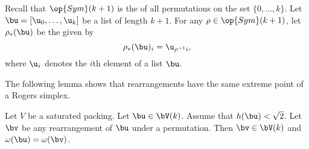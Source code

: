 Recall that $\op{Sym}(k+1)$ is the  of all permutations
on the set $\{0,\ldots,k\}$.  Let $\bu = [\u_0,\ldots, \u_k]$ be a
list of length $k+1$.  For any 
$\rho\in\op{Sym}(k+1)$, let $\rho_*(\bu)$ be the 
given by
\[  
\rho_*(\bu)_i =  \u_{\rho^{-1} i}, %
\]    
where $\u_i$ denotes the $i$th element of a list $\bu$.
%
%
%
%

The following lemma shows that rearrangements have the same extreme
point of a Rogers simplex.

\begin{lemma}
\label{lemma:perm-Vk} 
  Let $V$ be a saturated packing.  Let $\bu\in \bV(k)$.  Assume that
  $h(\bu)<\sqrt2$. Let $\bv$ be any rearrangement of $\bu$ under a
  permutation.  Then $\bv\in \bV(k)$ and $\omega(\bu) = \omega(\bv)$.
\end{lemma}

